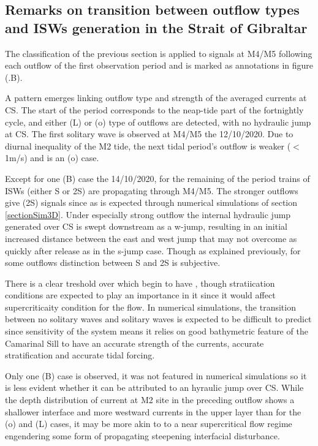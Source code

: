 \subsection{Remarks on transition between outflow types and ISWs generation in the Strait of Gibraltar}

The classification of the previous section is applied to signals at M4/M5 following each outflow of the first observation period and is marked as annotations in figure (.B).

A pattern emerges linking outflow type and strength of the averaged currents at CS. The start of the period corresponds to the neap-tide part of the fortnightly cycle, and either (L) or (o) type of outflows are detected, with no hydraulic jump at CS. The first solitary wave is observed at M4/M5 the 12/10/2020. Due to diurnal inequality of the M2 tide, the next tidal period's outflow is weaker ($<$1m/s) and is an (o) case.

Except for one (B) case the 14/10/2020, for the remaining of the period trains of ISWs (either S or 2S) are propagating through M4/M5. The stronger outflows give (2S) signals since as is expected through numerical simulations of section \ref{sectionSim3D}. Under especially strong outflow the internal hydraulic jump generated over CS is swept downstream as a w-jump, resulting in an initial increased distance between the east and west jump that may not overcome as quickly after release as in the s-jump case. Though as explained previously, for some outflows distinction between S and 2S is subjective.

There is a clear treshold over which begin to have , though stratiication conditions are expected to play an importance in it since it would affect supercriticaity condition for the flow. In numerical simulations, the transition between no solitary waves and solitary waves is expected to be difficult to predict since sensitivity of the system means it relies on good bathymetric feature of the Camarinal Sill to have an accurate strength of the currents, accurate stratification and accurate tidal forcing.

Only one (B) case is observed, it was not featured in numerical simulations so it is less evident whether it can be attributed to an hyraulic jump over CS. While the depth distribution of current at M2 site in the preceding outflow shows a shallower interface and more westward currents in the upper layer than for the (o) and (L) cases, it may be more akin to to a near supercritical flow regime engendering some form of propagating steepening interfacial disturbance.

